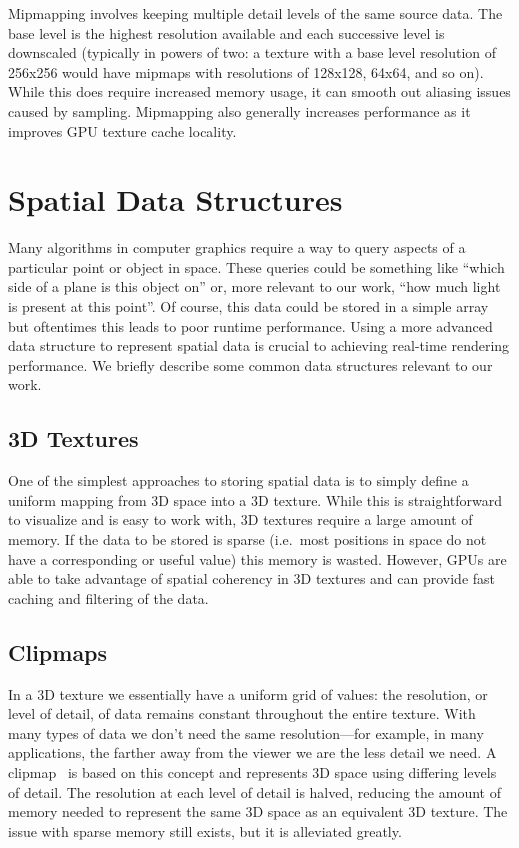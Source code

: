 Mipmapping involves keeping multiple detail levels of the same source data. The base level is the highest resolution available and each successive level is downscaled (typically in powers of two: a texture with a base level resolution of 256x256 would have mipmaps with resolutions of 128x128, 64x64, and so on). While this does require increased memory usage, it can smooth out aliasing issues caused by sampling. Mipmapping also generally increases performance as it improves GPU texture cache locality.



\section{Spatial Data Structures}
Many algorithms in computer graphics require a way to query aspects of a particular point or object in space. These queries could be something like ``which side of a plane is this object on'' or, more relevant to our work, ``how much light is present at this point''. Of course, this data could be stored in a simple array but oftentimes this leads to poor runtime performance. Using a more advanced data structure to represent spatial data is crucial to achieving real-time rendering performance. We briefly describe some common data structures relevant to our work.

\subsection{3D Textures}
One of the simplest approaches to storing spatial data is to simply define a uniform mapping from 3D space into a 3D texture. While this is straightforward to visualize and is easy to work with, 3D textures require a large amount of memory. If the data to be stored is sparse (i.e.\ most positions in space do not have a corresponding or useful value) this memory is wasted. However, GPUs are able to take advantage of spatial coherency in 3D textures and can provide fast caching and filtering of the data.

\subsection{Clipmaps}
In a 3D texture we essentially have a uniform grid of values: the resolution, or level of detail, of data remains constant throughout the entire texture. With many types of data we don't need the same resolution---for example, in many applications, the farther away from the viewer we are the less detail we need. A clipmap~\cite{Tanner:1998:CVM:280814.280855, Losasso:2004:GCT:1015706.1015799} is based on this concept and represents 3D space using differing levels of detail. The resolution at each level of detail is halved, reducing the amount of memory needed to represent the same 3D space as an equivalent 3D texture. The issue with sparse memory still exists, but it is alleviated greatly.

